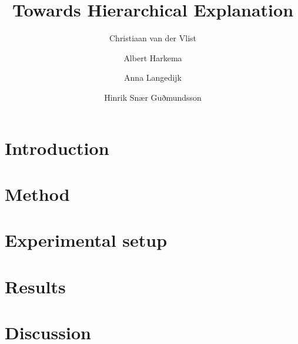 \documentclass[sigconf,authordraft]{acmart}
\begin{document}
\title{Towards Hierarchical Explanation}
\author{Christiaan van der Vlist}
\affiliation{
}

\author{Albert Harkema}
\affiliation{%
  \institution{}
  \country{}}

\author{Anna Langedijk}
\affiliation{%
  \institution{}
  \country{}
}

\author{Hinrik Snær Guðmundsson}
\affiliation{%
 \institution{}
 \country{}}
\renewcommand{\shortauthors}{van der Vlist, et al.}

\begin{abstract}


\end{abstract}


\maketitle

\section{Introduction}


\section{Method}


\section{Experimental setup}


\section{Results}


\section{Discussion}

\end{document}
